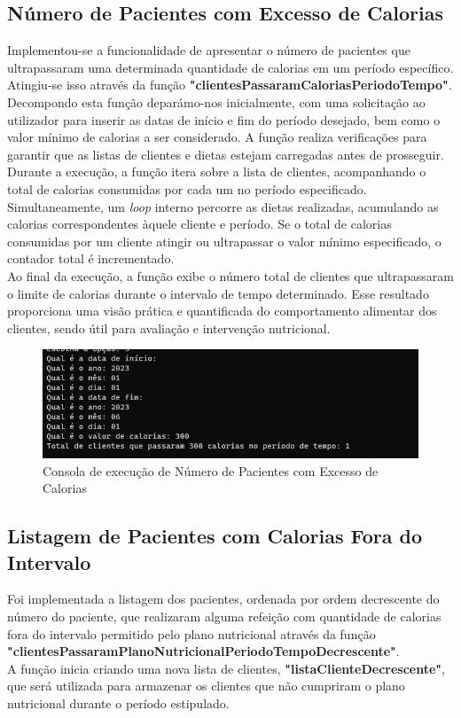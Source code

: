 \documentclass{article}
\begin{document}
\newpage

\subsection{Número de Pacientes com Excesso de Calorias}
Implementou-se a funcionalidade de apresentar o número de pacientes que ultrapassaram uma determinada quantidade de calorias em um período específico. Atingiu-se isso através da função \textbf{"clientesPassaramCaloriasPeriodoTempo"}. Decompondo esta função deparámo-nos inicialmente, com uma solicitação ao utilizador para inserir as datas de início e fim do período desejado, bem como o valor mínimo de calorias a ser considerado. A função realiza verificações para garantir que as listas de clientes e dietas estejam carregadas antes de prosseguir.\\

Durante a execução, a função itera sobre a lista de clientes, acompanhando o total de calorias consumidas por cada um no período especificado. Simultaneamente, um \emph{loop} interno percorre as dietas realizadas, acumulando as calorias correspondentes àquele cliente e período. Se o total de calorias consumidas por um cliente atingir ou ultrapassar o valor mínimo especificado, o contador total é incrementado.\\

Ao final da execução, a função exibe o número total de clientes que ultrapassaram o limite de calorias durante o intervalo de tempo determinado. Esse resultado proporciona uma visão prática e quantificada do comportamento alimentar dos clientes, sendo útil para avaliação e intervenção nutricional.\\

\begin{figure}[h]
    \centering
    \includegraphics[width=0.8\linewidth]{Ponto2.png}
    \caption{Consola de execução de Número de Pacientes com Excesso de Calorias}
    \label{fig:enter-label}
\end{figure}

\subsection{Listagem de Pacientes com Calorias Fora do Intervalo}
Foi implementada a listagem dos pacientes, ordenada por ordem decrescente do número do paciente, que realizaram alguma refeição com quantidade de calorias fora do intervalo permitido pelo plano nutricional através da função \textbf{"clientesPassaramPlanoNutricionalPeriodoTempoDecrescente"}.\\ A função inicia criando uma nova lista de clientes, \textbf{"listaClienteDecrescente"}, que será utilizada para armazenar os clientes que não cumpriram o plano nutricional durante o período estipulado.
\end{document}
